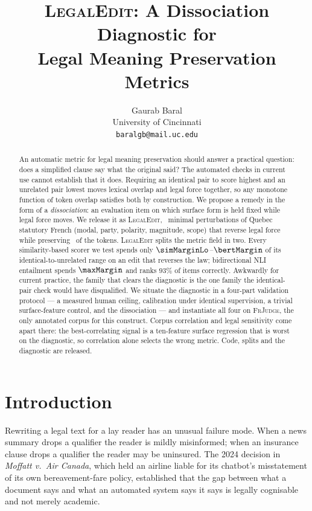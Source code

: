 \documentclass[11pt]{article}
\title{\textsc{LegalEdit}: A Dissociation Diagnostic for\\Legal Meaning Preservation Metrics}
\author{Gaurab Baral \\
  University of Cincinnati \\
  \texttt{baralgb@mail.uc.edu}}
\begin{document}
\maketitle

\begin{abstract}
An automatic metric for legal meaning preservation should answer a practical
question: does a simplified clause say what the original said? The automated
checks in current use cannot establish that it does. Requiring an identical pair
to score highest and an unrelated pair lowest moves lexical overlap and legal
force together, so any monotone function of token overlap satisfies both by
construction. We propose a remedy in the form of a \emph{dissociation}: an
evaluation item on which surface form is held fixed while legal force moves. We
release it as \textsc{LegalEdit}, \numedits\ minimal perturbations of Quebec
statutory French (modal, party, polarity, magnitude, scope) that reverse legal
force while preserving \meanjaccard\ of the tokens. \textsc{LegalEdit} splits
the metric field in two. Every similarity-based scorer we test spends only
$\simMarginLo$--$\bertMargin$ of its identical-to-unrelated range on an edit
that reverses the law; bidirectional NLI entailment spends $\maxMargin$ and
ranks $93\%$ of items correctly. Awkwardly for current practice, the family that
clears the diagnostic is the one family the identical-pair check would have
disqualified. We situate the diagnostic in a four-part validation
protocol --- a measured human ceiling, calibration under identical supervision,
a trivial surface-feature control, and the dissociation --- and instantiate all
four on \textsc{FrJudge}, the only annotated corpus for this construct. Corpus
correlation and legal sensitivity come apart there: the best-correlating signal
is a ten-feature surface regression that is worst on the diagnostic, so
correlation alone selects the wrong metric. Code, splits and the diagnostic are
released.
\end{abstract}

\section{Introduction}
\label{sec:intro}

Rewriting a legal text for a lay reader has an unusual failure mode. When a news
summary drops a qualifier the reader is mildly misinformed; when an insurance
clause drops a qualifier the reader may be uninsured. The 2024 decision in
\emph{Moffatt v.\ Air Canada}, which held an airline liable for its chatbot's
misstatement of its own bereavement-fare policy, established that the gap
between what a document says and what an automated system says it says is
legally cognisable and not merely academic.
\end{document}
